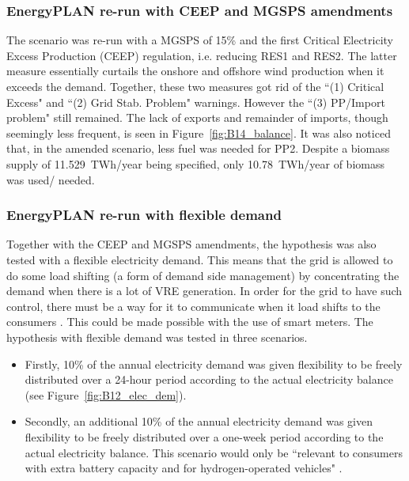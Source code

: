 \subsubsection{EnergyPLAN re-run with CEEP and MGSPS amendments}

The scenario was re-run with a MGSPS of 15\% and the first Critical Electricity Excess Production (CEEP) regulation, i.e. reducing RES1 and RES2.
The latter measure essentially curtails the onshore and offshore wind production when it exceeds the demand.
Together, these two measures got rid of the ``(1) Critical Excess" and ``(2) Grid Stab. Problem" warnings.
However the ``(3) PP/Import problem" still remained.
The lack of exports and remainder of imports, though seemingly less frequent, is seen in Figure~\ref{fig:B14_balance}.
It was also noticed that, in the amended scenario, less fuel was needed for PP2.
Despite a biomass supply of 11.529~TWh/year being specified, only 10.78~TWh/year of biomass was used/ needed.





\newpage
\subsubsection{EnergyPLAN re-run with flexible demand}



Together with the CEEP and MGSPS amendments, the hypothesis was also tested with a flexible electricity demand.
This means that the grid is allowed to do some load shifting (a form of demand side management) by concentrating the demand when there is a lot of VRE generation.
In order for the grid to have such control, there must be a way for it to communicate when it load shifts to the consumers \citep{Lund2017}.
This could be made possible with the use of smart meters.
The hypothesis with flexible demand was tested in three scenarios.
\begin{itemize}
	\item Firstly, 10\% of the annual electricity demand was given flexibility to be freely distributed over a 24-hour period according to the actual electricity balance (see Figure~\ref{fig:B12_elec_dem}).
	\item Secondly, an additional 10\% of the annual electricity demand was given flexibility to be freely distributed over a one-week period according to the actual electricity balance.
	This scenario would only be ``relevant to consumers with extra battery capacity and for hydrogen-operated vehicles" \citep[p.~107]{Lund2017}.
\end{itemize}

